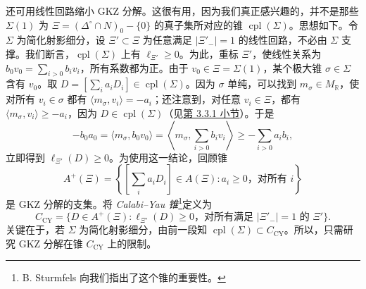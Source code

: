 还可用线性回路缩小 GKZ 分解。这很有用，因为我们真正感兴趣的，并不是那些 $\Sigma(1)$ 为 $\Xi=(\Delta^\circ\cap N)_0-\{0\}$ 的真子集所对应的锥 $\operatorname{cpl}(\Sigma)$。思想如下。令 $\Sigma$ 为简化射影细分，设 $\Xi'\subset\Xi$ 为任意满足 $|\Xi'_-|=1$ 的线性回路，不必由 $\Sigma$ 支撑。我们断言，$\operatorname{cpl}(\Sigma)$ 上有 $\ell_{\Xi'}\geq0$。为此，重标 $\Xi'$，使线性关系为 $b_0v_0=\sum_{i>0}b_i v_i$，所有系数都为正。由于 $v_0\in\Xi=\Sigma(1)$，某个极大锥 $\sigma\in\Sigma$ 含有 $v_0$。取 $D=[\sum_i a_iD_i]\in\operatorname{cpl}(\Sigma)$。因为 $\sigma$ 单纯，可以找到 $m_\sigma\in M_{\mathbb R}$，使对所有 $v_i\in\sigma$ 都有 $\langle m_\sigma,v_i\rangle=-a_i$；还注意到，对任意 $v_i\in\Xi$，都有 $\langle m_\sigma,v_i\rangle\geq-a_i$，因为 $D\in\operatorname{cpl}(\Sigma)$（见\hyperref[subsec:toric-kahler-cone]{第 3.3.1 小节}）。于是
\[
-b_0a_0=\langle m_\sigma,b_0v_0\rangle
=\left\langle m_\sigma,\sum_{i>0}b_i v_i\right\rangle
\geq-\sum_{i>0}a_i b_i,
\]
立即得到 $\ell_{\Xi'}(D)\geq0$。为使用这一结论，回顾锥
\[
A^+(\Xi)=\left\{\left[\sum_i a_iD_i\right]\in A(\Xi):a_i\geq0\text{，对所有 }i\right\}
\]
是 GKZ 分解的支集。将 \emph{Calabi--Yau 锥}\footnote{B. Sturmfels 向我们指出了这个锥的重要性。}定义为
\[
C_{\mathrm{CY}}=\{D\in A^+(\Xi):\ell_{\Xi'}(D)\geq0
\text{，对所有满足 }|\Xi'_-|=1\text{ 的 }\Xi'\}.
\]
关键在于，若 $\Sigma$ 为简化射影细分，由前一段知 $\operatorname{cpl}(\Sigma)\subset C_{\mathrm{CY}}$。所以，只需研究 GKZ 分解在锥 $C_{\mathrm{CY}}$ 上的限制。

